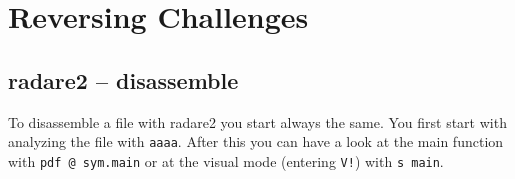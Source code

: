 
\section{Reversing Challenges}

\subsection{radare2 -- disassemble} To disassemble a file with radare2 you start always the same. You first start with analyzing the file with \texttt{aaaa}. After this you can have a look at the main function with \texttt{pdf @ sym.main} or at the visual mode (entering \texttt{V!}) with \texttt{s main}.
